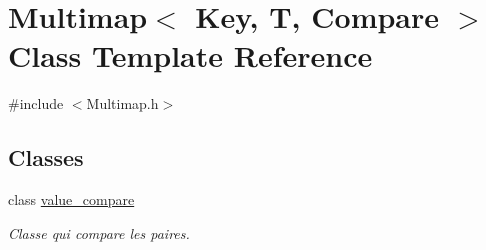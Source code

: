 \hypertarget{classMultimap}{}\section{Multimap$<$ Key, T, Compare $>$ Class Template Reference}
\label{classMultimap}


{\ttfamily \#include $<$Multimap.\+h$>$}

\subsection*{Classes}
\begin{DoxyCompactItemize}
\item 
class \hyperlink{classMultimap_1_1value__compare}{value\+\_\+compare}
\begin{DoxyCompactList}\small\item\em Classe qui compare les paires. \end{DoxyCompactList}\end{DoxyCompactItemize}
